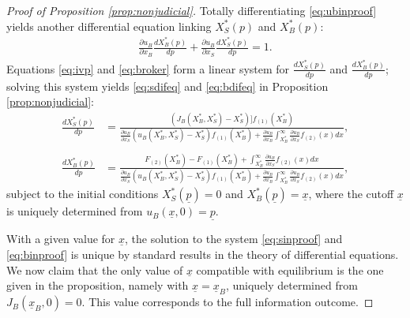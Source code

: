\documentclass[11pt,twopage]{article}
\begin{document}
\begin{proof}[Proof of Proposition \ref{prop:nonjudicial}]
  Totally differentiating \eqref{eq:ubinproof} yields another
  differential equation linking $X_S^*(p)$ and $X_B^*(p)$:
  \begin{align}
    \frac{\partial u_B}{\partial x_B}\frac{d X_B^*(p)}{dp} +
    \frac{\partial u_B}{\partial x_S}\frac{d X_S^*(p)}{dp}= 1.
    \label{eq:broker}
  \end{align}
  Equations \eqref{eq:ivp} and \eqref{eq:broker} form a linear system
  for $\frac{dX_S^*(p)}{dp}$ and $\frac{dX_B^*(p)}{dp}$; solving this
  system yields \eqref{eq:sdifeq} and \eqref{eq:bdifeq} in Proposition
  \ref{prop:nonjudicial}: \begin{align} \frac{d X_S^*(p)}{dp}&=
    \frac{(J_B(X_B^*,X_S^*)-X_S^*)]f_{(1)}(X_B^*)}{ \frac{\partial
        u_B}{\partial x_S} (u_B(X_B^*,X_S^*)-X_S^*)f_{(1)}(X_B^*)+
      \frac{ \partial u_B}{\partial x_B } \int_{X_B^*}^\infty
      \frac{ \partial u_B} {\partial x_S} f_{(2)}(x) dx
    }, \label{eq:sinproof} \\ \nonumber
    \\
    \frac{d X_B^*(p)}{dp}&= \frac{ F_{(2)}(X_B^*) - F_{(1)}(X_B^*) +
      \int_{X_B^*}^\infty \frac{ \partial u_B} {\partial x_S}
      f_{(2)}(x) dx }{ \frac{\partial u_B}{\partial x_S}
      (u_B(X_B^*,X_S^*)-X_S^*)f_{(1)}(X_B^*)+ \frac{ \partial
        u_B}{\partial x_B } \int_{X_B^*}^\infty \frac{ \partial u_B}
      {\partial x_S} \label{eq:binproof} f_{(2)}(x) dx } ,
  \end{align}
  subject to the initial conditions $X_S^*(\underline p) = 0$ and
  $X_B^*(\underline p) = \underline x$, where the cutoff $\underline
  x$ is uniquely determined from $u_B(\underline x, 0) = \underline
  p$.

  With a given value for $\underline x$, the solution to the system
  \eqref{eq:sinproof} and \eqref{eq:binproof} is unique by standard
  results in the theory of differential equations. We now claim that
  the only value of $\underline x$ compatible with equilibrium is the
  one given in the proposition, namely with $\underline x = \underline
  x_B$, uniquely determined from $J_B(\underline x_B,0) = 0$. This
  value corresponds to the full information outcome.


\end{proof}
\end{document}
